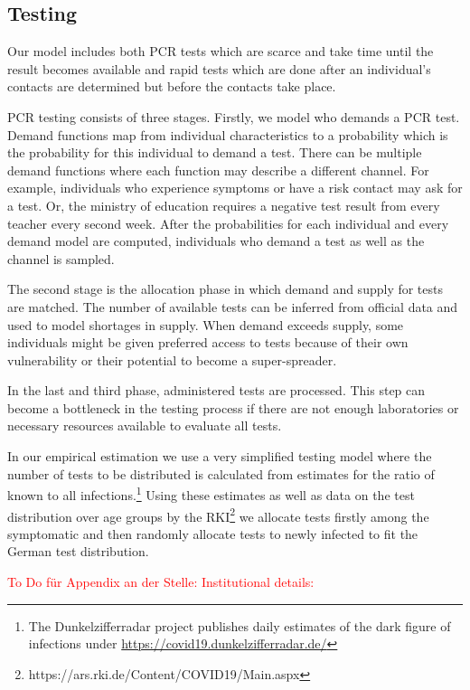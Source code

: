 \subsection{Testing} %
\label{sub:testing}

Our model includes both PCR tests which are scarce and take time until the result becomes
available and rapid tests which are done after an individual's contacts are determined
but before the contacts take place.

PCR testing consists of three stages. Firstly, we model who demands a PCR test. Demand
functions map from individual characteristics to a probability which is the probability
for this individual to demand a test. There can be multiple demand functions where each
function may describe a different channel. For example, individuals who experience
symptoms or have a risk contact may ask for a test. Or, the ministry of education
requires a negative test result from every teacher every second week. After the
probabilities for each individual and every demand model are computed, individuals who
demand a test as well as the channel is sampled.

The second stage is the allocation phase in which demand and supply for tests are
matched. The number of available tests can be inferred from official data and used to
model shortages in supply. When demand exceeds supply, some individuals might be given
preferred access to tests because of their own vulnerability or their potential to
become a super-spreader.

In the last and third phase, administered tests are processed. This step can become a
bottleneck in the testing process if there are not enough laboratories or necessary
resources available to evaluate all tests.

In our empirical estimation we use a very simplified testing model where the number of
tests to be distributed is calculated from estimates for the ratio of known to all
infections.\footnote{The Dunkelzifferradar project publishes daily estimates of the dark
figure of infections under \url{https://covid19.dunkelzifferradar.de/}} Using these
estimates as well as data on the test distribution over age groups by the
RKI\footnote{https://ars.rki.de/Content/COVID19/Main.aspx} we allocate tests firstly
among the symptomatic and then randomly allocate tests to newly infected to fit the
German test distribution.

\textcolor{red}{To Do für Appendix an der Stelle: Institutional details:}


